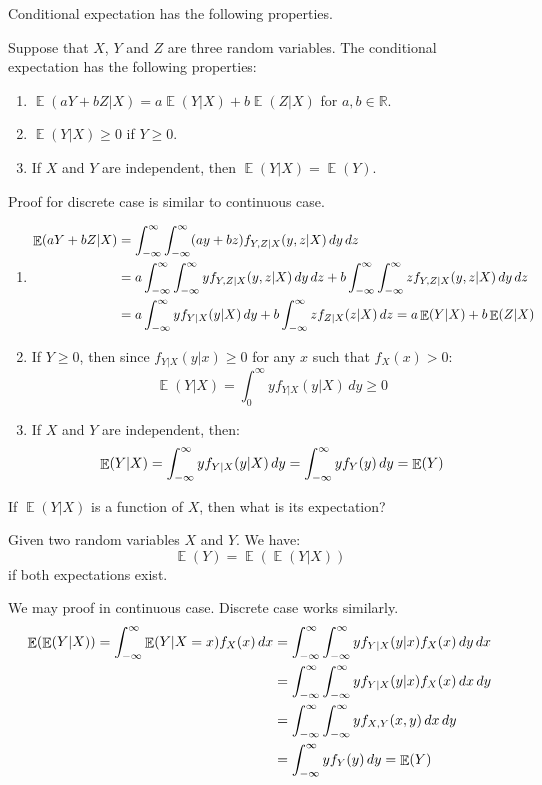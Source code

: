 \documentclass{huhtakm-template-book-v2}
\DeclareMathOperator{\E}{\mathbb{E}}
\begin{document}
\newpage
Conditional expectation has the following properties.
\begin{lem}
	\label{Chapter 1 (Lemma) Properties of conditional expectation}
	Suppose that $X$, $Y$ and $Z$ are three random variables. The conditional expectation has the following properties:
	\begin{enumerate}
		\item $\E(aY+bZ|X)=a\E(Y|X)+b\E(Z|X)$ for $a,b\in\mathbb{R}$.
		\item $\E(Y|X)\geq 0$ if $Y\geq 0$.
		\item If $X$ and $Y$ are independent, then $\E(Y|X)=\E(Y)$.
	\end{enumerate}
\end{lem}
\begin{proofing}
	Proof for discrete case is similar to continuous case.
	\begin{enumerate}
		\item 
		\begin{align*}
			\E(aY+bZ|X)&=\intinfty\intinfty(ay+bz)f_{Y,Z|X}(y,z|X)\,dy\,dz\\
			&=a\intinfty\intinfty yf_{Y,Z|X}(y,z|X)\,dy\,dz+b\intinfty\intinfty zf_{Y,Z|X}(y,z|X)\,dy\,dz\\
			&=a\intinfty yf_{Y|X}(y|X)\,dy+b\intinfty zf_{Z|X}(z|X)\,dz=a\E(Y|X)+b\E(Z|X)
		\end{align*}
		\item If $Y\geq 0$, then since $f_{Y|X}(y|x)\geq 0$ for any $x$ such that $f_{X}(x)>0$:
		\begin{equation*}
			\E(Y|X)=\int_{0}^{\infty}yf_{Y|X}(y|X)\,dy\geq 0
		\end{equation*} 
		\item If $X$ and $Y$ are independent, then:
		\begin{equation*}
			\E(Y|X)=\intinfty yf_{Y|X}(y|X)\,dy=\intinfty yf_{Y}(y)\,dy=\E(Y)
		\end{equation*}
	\end{enumerate}
\end{proofing}
If $\E(Y|X)$ is a function of $X$, then what is its expectation?
\begin{thm}
	Given two random variables $X$ and $Y$. We have:
	\begin{equation*}
		\E(Y)=\E(\E(Y|X))
	\end{equation*}
	if both expectations exist. 
\end{thm}
\begin{proofing}
	We may proof in continuous case. Discrete case works similarly.
	\begin{align*}
		\E(\E(Y|X))=\intinfty\E(Y|X=x)f_{X}(x)\,dx&=\intinfty\intinfty y f_{Y|X}(y|x)f_{X}(x)\,dy\,dx\\
		&=\intinfty\intinfty yf_{Y|X}(y|x)f_{X}(x)\,dx\,dy\\
		&=\intinfty\intinfty yf_{X,Y}(x,y)\,dx\,dy\\
		&=\intinfty yf_{Y}(y)\,dy=\E(Y)
	\end{align*}
\end{proofing}
\end{document}
